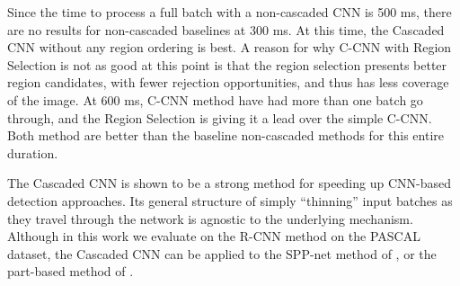 Since the time to process a full batch with a non-cascaded CNN is 500 ms, there are no results for non-cascaded baselines at 300 ms.
At this time, the Cascaded CNN without any region ordering is best.
A reason for why C-CNN with Region Selection is not as good at this point is that the region selection presents better region candidates, with fewer rejection opportunities, and thus has less coverage of the image.
At 600 ms, C-CNN method have had more than one batch go through, and the Region Selection is giving it a lead over the simple C-CNN.
Both method are better than the baseline non-cascaded methods for this entire duration.

The Cascaded CNN is shown to be a strong method for speeding up CNN-based detection approaches.
Its general structure of simply ``thinning'' input batches as they travel through the network is agnostic to the underlying mechanism.
Although in this work we evaluate on the R-CNN method on the PASCAL dataset, the Cascaded CNN can be applied to the SPP-net method of \cite{He-ECCV-2014}, or the part-based method of \cite{Zhang-ECCV-2014}.
